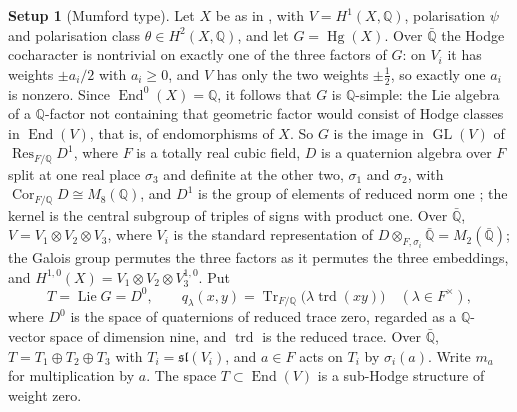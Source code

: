 \documentclass[11pt,reqno]{amsart}
\theoremstyle{plain}
\theoremstyle{definition}
\newtheorem{setupenv}[theorem]{Setup}
\theoremstyle{remark}
\newcommand{\QQ}{\mathbb{Q}}
\DeclareMathOperator{\End}{End}
\DeclareMathOperator{\Res}{Res}
\DeclareMathOperator{\Hg}{Hg}
\DeclareMathOperator{\Tr}{Tr}
\DeclareMathOperator{\GL}{GL}
\begin{document}
\begin{setupenv}[Mumford type]\label{setup:mumford}
Let $X$ be as in , with $V=H^{1}(X,\QQ)$,
polarisation $\psi$ and polarisation class $\theta\in H^{2}(X,\QQ)$, and let
$G=\Hg(X)$. Over $\bar{\QQ}$ the Hodge cocharacter is nontrivial on exactly
one of the three factors of $G$: on $V_{i}$ it has weights $\pm a_{i}/2$ with
$a_{i}\ge0$, and $V$ has only the two weights $\pm\frac12$, so exactly one
$a_{i}$ is nonzero. Since $\End^{0}(X)=\QQ$, it follows that $G$ is
$\QQ$-simple: the Lie algebra of a $\QQ$-factor not containing that geometric
factor would consist of Hodge classes in $\End(V)$, that is, of endomorphisms
of $X$. So $G$ is the image in
$\GL(V)$ of $\Res_{F/\QQ}D^{1}$, where $F$ is a totally real cubic field, $D$
is a quaternion algebra over $F$ split at one real place $\sigma_{3}$ and
definite at the other two, $\sigma_{1}$ and $\sigma_{2}$, with
$\operatorname{Cor}_{F/\QQ}D\cong M_{8}(\QQ)$, and $D^{1}$ is the group of
elements of reduced norm one \cite{Mum69,Gal00}; the kernel is the central
subgroup of triples of signs with product one. Over $\bar{\QQ}$,
$V=V_{1}\otimes V_{2}\otimes V_{3}$, where $V_{i}$ is the standard
representation of $D\otimes_{F,\sigma_{i}}\bar{\QQ}=M_{2}(\bar{\QQ})$; the
Galois group permutes the three factors as it permutes the three embeddings,
and $H^{1,0}(X)=V_{1}\otimes V_{2}\otimes V_{3}^{1,0}$. Put
\[
  T=\operatorname{Lie}G=D^{0},
  \qquad
  q_{\lambda}(x,y)=\Tr_{F/\QQ}\bigl(\lambda\operatorname{trd}(xy)\bigr)
  \quad(\lambda\in F^{\times}),
\]
where $D^{0}$ is the space of quaternions of reduced trace zero, regarded as
a $\QQ$-vector space of dimension nine, and $\operatorname{trd}$ is the
reduced trace. Over $\bar{\QQ}$, $T=T_{1}\oplus T_{2}\oplus T_{3}$ with
$T_{i}=\mathfrak{sl}(V_{i})$, and $a\in F$ acts on $T_{i}$ by $\sigma_{i}(a)$.
Write $m_{a}$ for multiplication by $a$. The space $T\subset\End(V)$ is a
sub-Hodge structure of weight zero.
\end{setupenv}
\end{document}
